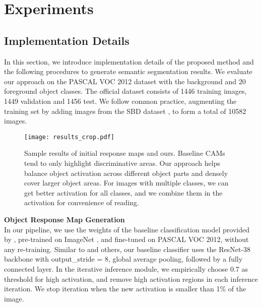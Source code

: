 \documentclass[10pt,twocolumn,letterpaper]{article}
\begin{document}
\section{Experiments}
\subsection{Implementation Details}
In this section, we introduce implementation details of the proposed method and the following procedures to generate semantic segmentation results.
We evaluate our approach on the PASCAL VOC 2012 dataset \cite{everingham2010pascal} with the background and 20 foreground object classes.
The official dataset consists of  1446 
training
images,
 1449 
 validation and 1456 
test. 
We follow common practice, augmenting the training set by adding images from the SBD dataset \cite{hariharan2011semantic}, to form a total
of 10582 images.

\begin{figure*}[!htb]
   \begin{center}
\texttt{[image: results\_crop.pdf]} 
   \end{center}
\caption{Sample results of initial response maps and ours. Baseline CAMs tend to only highlight discriminative areas.
Our approach helps balance object activation across different object parts and densely cover larger object areas.
For images with multiple classes, we can get better activation for all classes, and we combine them in the activation for convenience of reading.
}
\vspace{-3mm}
   \label{fig:results}
\end{figure*}

\noindent\textbf{Object Response Map Generation}\\
In our pipeline, we use the weights of the baseline classification model provided by \cite{ahn2018learning}, pre-trained on 
ImageNet \cite{deng2009imagenet}, and fine-tuned on PASCAL VOC 2012, without any re-training.
Similar to \cite{ahn2018learning} and others,
our baseline classifier uses the ResNet-38 backbone with output\_stride = 8, global average pooling, followed by a fully connected layer. 
In the iterative inference module, we empirically choose 0.7 as threshold for high activation, and remove high activation regions in each inference iteration. 
We stop iteration when the new
activation is smaller than 1\% of the image. 
\end{document}
